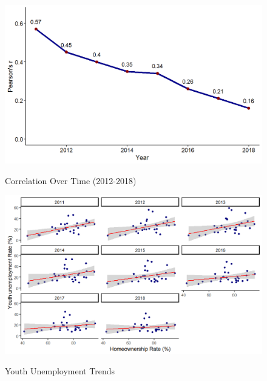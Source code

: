 \documentclass[11pt]{article}
\begin{document}
\begin{multicols}{2}
		\vspace{-1em}
		
		\begin{figure}[H]
			\centering
			\caption{Correlation Over Time (2012-2018)}
			\includegraphics[width=1\linewidth]{cor_year.png}
			\label{fig:cor_year}
		\end{figure}
		
		\vspace{-1em}
		
		\begin{figure}[H]
			\centering
			\caption{Youth Unemployment Trends}
			\includegraphics[width=1\linewidth]{youth_unemployment_trends.png}
			\label{fig:youth_unemployment_trends}
		\end{figure}
		

\end{multicols}
\end{document}
